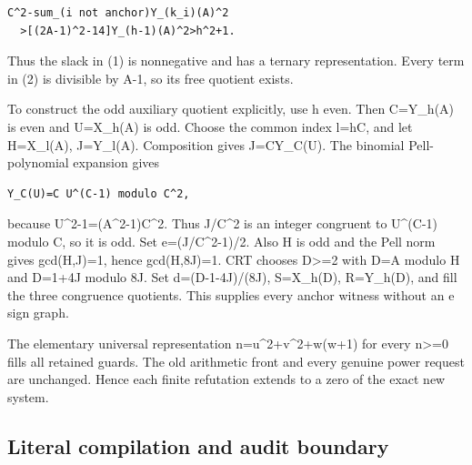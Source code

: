 \begin{verbatim}
C^2-sum_(i not anchor)Y_(k_i)(A)^2
  >[(2A-1)^2-14]Y_(h-1)(A)^2>h^2+1.
\end{verbatim}

Thus the slack in (1) is nonnegative and has a ternary representation. Every term in (2) is divisible by A-1, so its free quotient exists.



To construct the odd auxiliary quotient explicitly, use h even. Then C=\allowbreak{}Y\_\allowbreak{}h(A) is even and U=\allowbreak{}X\_\allowbreak{}h(A) is odd. Choose the common index l=\allowbreak{}hC, and let H=\allowbreak{}X\_\allowbreak{}l(A), J=\allowbreak{}Y\_\allowbreak{}l(A). Composition gives J=\allowbreak{}C\textasteriskcentered{}\allowbreak{}Y\_\allowbreak{}C(U). The binomial Pell-polynomial expansion gives



\begin{verbatim}
Y_C(U)=C U^(C-1) modulo C^2,
\end{verbatim}

because U\textasciicircum{}\allowbreak{}2-1=\allowbreak{}(A\textasciicircum{}\allowbreak{}2-1)C\textasciicircum{}\allowbreak{}2. Thus J/\allowbreak{}C\textasciicircum{}\allowbreak{}2 is an integer congruent to U\textasciicircum{}\allowbreak{}(C-1) modulo C, so it is odd. Set e=\allowbreak{}(J/\allowbreak{}C\textasciicircum{}\allowbreak{}2-1)/\allowbreak{}2. Also H is odd and the Pell norm gives gcd(H,J)=\allowbreak{}1, hence gcd(H,8J)=\allowbreak{}1. CRT chooses D\textgreater{}\allowbreak{}=\allowbreak{}2 with D=\allowbreak{}A modulo H and D=\allowbreak{}1+\allowbreak{}4J modulo 8J. Set d=\allowbreak{}(D-1-4J)/\allowbreak{}(8J), S=\allowbreak{}X\_\allowbreak{}h(D), R=\allowbreak{}Y\_\allowbreak{}h(D), and fill the three congruence quotients. This supplies every anchor witness without an e sign graph.



The elementary universal representation n=\allowbreak{}u\textasciicircum{}\allowbreak{}2+\allowbreak{}v\textasciicircum{}\allowbreak{}2+\allowbreak{}w(w+\allowbreak{}1) for every n\textgreater{}\allowbreak{}=\allowbreak{}0 fills all retained guards. The old arithmetic front and every genuine power request are unchanged. Hence each finite refutation extends to a zero of the exact new system.



\subsection{Literal compilation and audit boundary}



